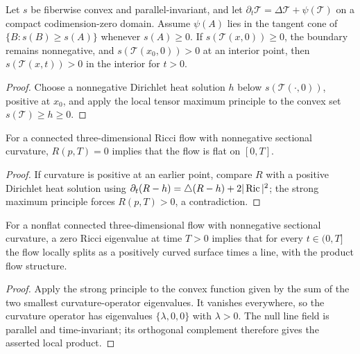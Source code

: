 \begin{proposition}
\label{prop:strong-maximum-principle-curvature}
\label{SMPcurv}
Let $s$ be fiberwise convex and parallel-invariant, and let
$\partial_t{\mathcal T}=\Delta{\mathcal T}+\psi({\mathcal T})$ on a compact
codimension-zero domain. Assume $\psi(A)$ lies in the tangent cone of
$\{B:s(B)\ge s(A)\}$ whenever $s(A)\ge0$. If $s({\mathcal T}(x,0))\ge0$,
the boundary remains nonnegative, and $s({\mathcal T}(x_0,0))>0$ at an
interior point, then $s({\mathcal T}(x,t))>0$ in the interior for $t>0$.
\end{proposition}
\begin{proof}
\sketch Choose a nonnegative Dirichlet heat solution $h$ below
$s({\mathcal T}(\cdot,0))$, positive at $x_0$, and apply the local tensor
maximum principle to the convex set $s({\mathcal T})\ge h\ge0$.
\end{proof}

\begin{theorem}
\label{thm:vanishing-scalar-curvature-forces-flat}\label{firststrongmax}
For a connected three-dimensional Ricci flow with nonnegative sectional
curvature, $R(p,T)=0$ implies that the flow is flat on $[0,T]$.
\end{theorem}
\begin{proof}
\sketch If curvature is positive at an earlier point, compare $R$ with a
positive Dirichlet heat solution using
$\partial_t(R-h)=\triangle(R-h)+2|\operatorname{Ric}|^2$; the strong maximum principle
forces $R(p,T)>0$, a contradiction.
\end{proof}

\begin{corollary}
\label{cor:local-product-splitting-ricci-null-eigenvalue}
\label{localprod}
For a nonflat connected three-dimensional flow with nonnegative sectional
curvature, a zero Ricci eigenvalue at time $T>0$ implies that for every
$t\in(0,T]$ the flow locally splits as a positively curved surface times a
line, with the product flow structure.
\end{corollary}
\begin{proof}
\sketch Apply the strong principle to the convex function given by the sum
of the two smallest curvature-operator eigenvalues. It vanishes everywhere,
so the curvature operator has eigenvalues $\{\lambda,0,0\}$ with $\lambda>0$.
The null line field is parallel and time-invariant; its orthogonal complement
therefore gives the asserted local product.
\end{proof}

